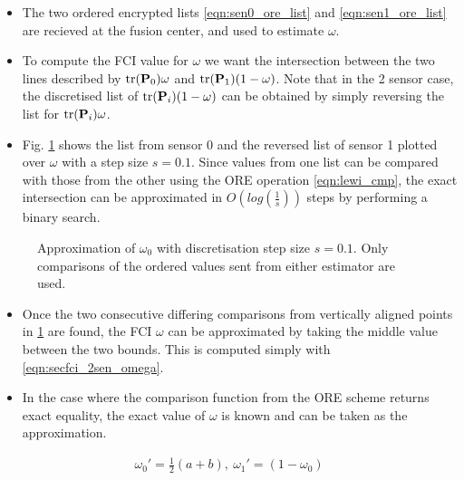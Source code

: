 \documentclass[letterpaper, 10 pt, conference]{ieeeconf}  %
\begin{document}
\begin{itemize}
   \item The two ordered encrypted lists \eqref{eqn:sen0_ore_list} and \eqref{eqn:sen1_ore_list} are recieved at the fusion center, and used to estimate $\omega$.
   \item To compute the FCI value for $\omega$ we want the intersection between the two lines described by $\operatorname{tr}({{\mathbf{P}}}_0)\omega$ and $\operatorname{tr}({{\mathbf{P}}}_1)(1-\omega)$. Note that in the 2 sensor case, the discretised list of $\operatorname{tr}({{\mathbf{P}}}_i)(1-\omega)$ can be obtained by simply reversing the list for $\operatorname{tr}({{\mathbf{P}}}_i)\omega$.
   \item Fig. \ref{fig:2_sensor_sol} shows the list from sensor 0 and the reversed list of sensor 1 plotted over $\omega$ with a step size $s=0.1$. Since values from one list can be compared with those from the other using the ORE operation \eqref{eqn:lewi_cmp}, the exact intersection can be approximated in $O(log(\frac{1}{s}))$ steps by performing a binary search.
\end{itemize}
\begin{figure}[tb]
   \begin{center}
      
   \end{center}
   \caption{Approximation of $\omega_0$ with discretisation step size $s=0.1$. Only comparisons of the ordered values sent from either estimator are used.}
   \label{fig:2_sensor_sol}
\end{figure}
\begin{itemize}
   \item Once the two consecutive differing comparisons from vertically aligned points in \ref{fig:2_sensor_sol} are found, the FCI $\omega$ can be approximated by taking the middle value between the two bounds. This is computed simply with \eqref{eqn:secfci_2sen_omega}.
   \item In the case where the comparison function from the ORE scheme returns exact equality, the exact value of $\omega$ is known and can be taken as the approximation.
\end{itemize}
\begin{gather}
   \omega_0'=\frac{1}{2}(a + b),\ \omega_1' = (1-\omega_0) \label{eqn:secfci_2sen_omega}
\end{gather}

\end{document}
